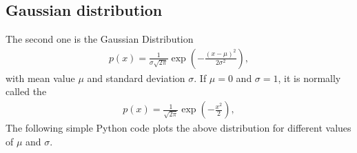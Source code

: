 \documentclass[letterpaper,10pt,english]{sphinxmanual}
\begin{document}
\subsection{Gaussian distribution}
\label{\detokenize{chapter3:gaussian-distribution}}
The second one is the Gaussian Distribution
\begin{equation*}
\begin{split}
p(x) = \frac{1}{\sigma\sqrt{2\pi}} \exp{(-\frac{(x-\mu)^2}{2\sigma^2})},
\end{split}
\end{equation*}
with mean value \(\mu\) and standard deviation \(\sigma\). If \(\mu=0\) and \(\sigma=1\), it is normally called the 
\begin{equation*}
\begin{split}
p(x) = \frac{1}{\sqrt{2\pi}} \exp{(-\frac{x^2}{2})},
\end{split}
\end{equation*}
The following simple Python code plots the above distribution for different values of \(\mu\) and \(\sigma\).
\end{document}
